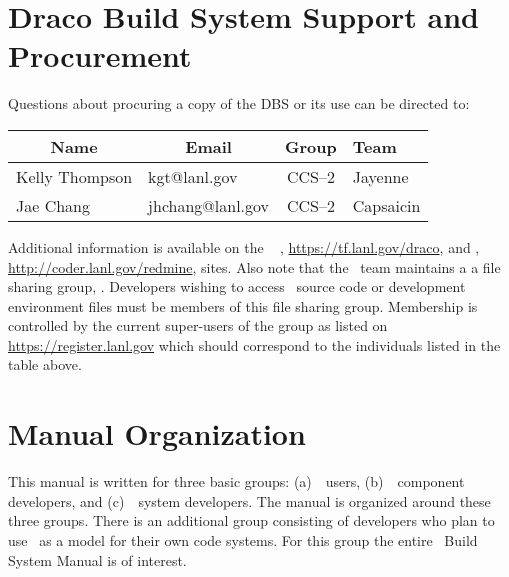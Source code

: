 \section{Draco Build System Support and Procurement}
\label{sec:procurement}
 

Questions about procuring a copy of the DBS or its use can be directed to:
\begin{center}
  \begin{tabular}{llcl}\hline\hline
    \multicolumn{1}{c}{Name} & \multicolumn{1}{c}{Email} &
    Group & Team \\ \hline
    Kelly Thompson & kgt@lanl.gov     & CCS--2 & Jayenne \\
    Jae Chang      & jhchang@lanl.gov & CCS--2 & Capsaicin \\ \hline\hline
  \end{tabular}
\end{center}  
Additional information is available on the \draco\  , \href{https://tf.lanl.gov/draco}{https://tf.lanl.gov/draco}, and  , \href{http://coder.lanl.gov/redmine}{http://coder.lanl.gov/redmine}, sites.  Also note that the \draco\ team 
maintains a a  file sharing group,  .  
Developers wishing to access \draco\ source code or development environment files must be members of this file sharing group. 
Membership is controlled by the current super-users of the group as listed on \href{https://register.lanl.gov}{https://register.lanl.gov} 
which should correspond to the individuals listed in the table above.



\section{Manual Organization}

This manual is written for three basic groups: (a)~\draco\ users, (b)~\draco\ component developers, and (c)~\draco\ system developers. The
manual is organized around these three groups. There is an additional
group consisting of developers who plan to use \draco\ as a model for
their own code systems.  For this group the entire \draco\ Build
System Manual is of interest.

